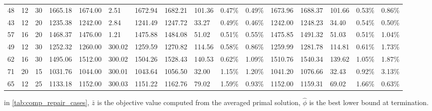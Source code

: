 \begin{longtable}{l|ll|lll|lllll|lllll}
   48 & 12                         & 30                         & 1665.18                   & 1674.00     & 2.51                & 1672.94 & 1682.21 & 101.36 & 0.47\%  & 0.49\% & 1673.96 & 1688.37 & 101.66 & 0.53\%  & 0.86\% \\
   43 & 12                         & 20                         & 1235.38                   & 1242.00     & 2.84                & 1241.49 & 1247.72 & 33.27  & 0.49\%  & 0.46\% & 1242.00 & 1248.23 & 34.40  & 0.54\%  & 0.50\% \\
   57 & 16                         & 20                         & 1468.37                   & 1476.00     & 1.21                & 1475.88 & 1484.08 & 51.02  & 0.51\%  & 0.55\% & 1475.85 & 1491.32 & 51.03  & 0.51\%  & 1.04\% \\
   49 & 12                         & 30                         & 1252.32                   & 1260.00     & 300.02              & 1259.59 & 1270.82 & 114.56 & 0.58\%  & 0.86\% & 1259.99 & 1281.78 & 114.81 & 0.61\%  & 1.73\% \\
   62 & 16                         & 30                         & 1495.06                   & 1512.00     & 300.02              & 1504.26 & 1528.43 & 140.53 & 0.62\%  & 1.09\% & 1510.76 & 1540.34 & 139.62 & 1.05\%  & 1.87\% \\
   71 & 20                         & 15                         & 1031.76                   & 1044.00     & 300.01              & 1043.64 & 1056.50 & 32.00  & 1.15\%  & 1.20\% & 1041.20 & 1076.66 & 32.43  & 0.92\%  & 3.13\% \\
   65 & 12                         & 25                         & 1133.18                   & 1152.00     & 300.03              & 1151.22 & 1162.76 & 79.02  & 1.59\%  & 0.93\% & 1152.00 & 1159.31 & 69.02  & 1.66\%  & 0.63\% \\
   \bottomrule
\end{longtable}

\small
in \ref{tab:comp_repair_cases}, $\bar z$ is the objective value computed from
the averaged primal solution,
$\hat \phi$ is the best lower bound at termination.

\normalsize